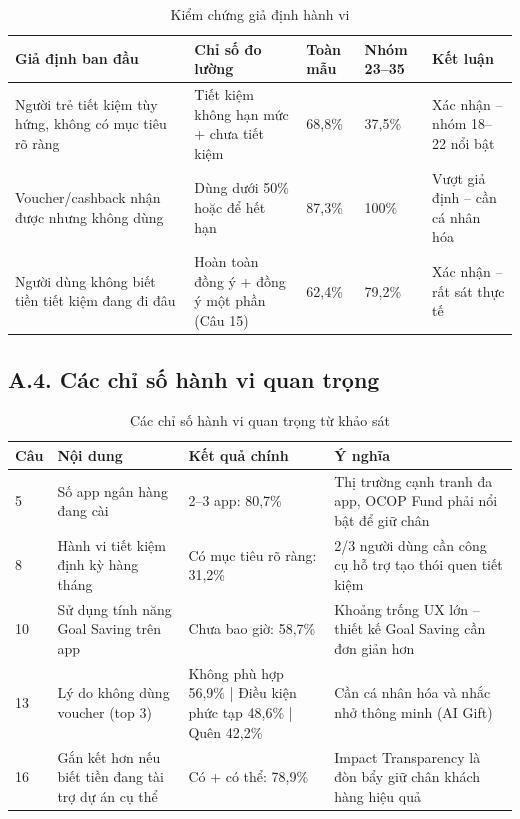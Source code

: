 \documentclass[13pt,a4paper]{extarticle}
\begin{document}
\begin{table}[H]
\centering
\caption{Kiểm chứng giả định hành vi}
\begin{tabular}{|p{4cm}|p{3cm}|p{2cm}|p{2cm}|p{3cm}|}
\hline
\textbf{Giả định ban đầu} & \textbf{Chỉ số đo lường} & \textbf{Toàn mẫu} & \textbf{Nhóm 23--35} & \textbf{Kết luận} \\
\hline
Người trẻ tiết kiệm tùy hứng, không có mục tiêu rõ ràng & Tiết kiệm không hạn mức + chưa tiết kiệm & 68,8\% & 37,5\% & Xác nhận -- nhóm 18--22 nổi bật \\
\hline
Voucher/cashback nhận được nhưng không dùng & Dùng dưới 50\% hoặc để hết hạn & 87,3\% & 100\% & Vượt giả định -- cần cá nhân hóa \\
\hline
Người dùng không biết tiền tiết kiệm đang đi đâu & Hoàn toàn đồng ý + đồng ý một phần (Câu 15) & 62,4\% & 79,2\% & Xác nhận -- rất sát thực tế \\
\hline
\end{tabular}
\end{table}

\subsection*{A.4. Các chỉ số hành vi quan trọng}

\begin{table}[H]
\centering
\caption{Các chỉ số hành vi quan trọng từ khảo sát}
\begin{tabular}{|p{1cm}|p{5cm}|p{3cm}|p{4cm}|}
\hline
\textbf{Câu} & \textbf{Nội dung} & \textbf{Kết quả chính} & \textbf{Ý nghĩa} \\
\hline
5 & Số app ngân hàng đang cài & 2--3 app: 80,7\% & Thị trường cạnh tranh đa app, OCOP Fund phải nổi bật để giữ chân \\
\hline
8 & Hành vi tiết kiệm định kỳ hàng tháng & Có mục tiêu rõ ràng: 31,2\% & 2/3 người dùng cần công cụ hỗ trợ tạo thói quen tiết kiệm \\
\hline
10 & Sử dụng tính năng Goal Saving trên app & Chưa bao giờ: 58,7\% & Khoảng trống UX lớn -- thiết kế Goal Saving cần đơn giản hơn \\
\hline
13 & Lý do không dùng voucher (top 3) & Không phù hợp 56,9\% | Điều kiện phức tạp 48,6\% | Quên 42,2\% & Cần cá nhân hóa và nhắc nhở thông minh (AI Gift) \\
\hline
16 & Gắn kết hơn nếu biết tiền đang tài trợ dự án cụ thể & Có + có thể: 78,9\% & Impact Transparency là đòn bẩy giữ chân khách hàng hiệu quả \\
\hline
\end{tabular}
\end{table}
\end{document}
